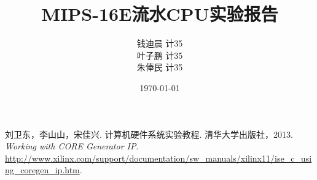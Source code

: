\documentclass[11pt, a4paper, titlepage]{article}
\title{\textbf{MIPS-16E流水CPU实验报告}}
\author{
    \kai 钱迪晨 \quad 计35 \quad 2013011402 \\
    \kai 叶子鹏 \quad 计35 \quad 2013011404 \\
    \kai 朱俸民 \quad 计35 \quad 2012011894
}
\date{\kai\today}
\begin{document}
\maketitle

\renewcommand{\contentsname}{目录}
\tableofcontents

\newpage








\renewcommand{\refname}{参考资料}
\begin{thebibliography}{9}
    \bibitem{} 刘卫东，李山山，宋佳兴. 计算机硬件系统实验教程. 清华大学出版社，2013.
    \bibitem{} \textit{Working with CORE Generator IP}.  \url{http://www.xilinx.com/support/documentation/sw_manuals/xilinx11/ise_c_using_coregen_ip.htm}.
\end{thebibliography}
\end{document}

